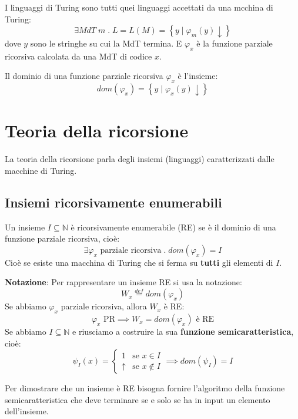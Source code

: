 \documentclass[a4paper]{article}
\begin{document}
\vspace{1em}
\noindent
I linguaggi di Turing sono tutti quei linguaggi accettati da una mcchina di Turing:
\[
  \exists  MdT \; m \;.\; L = L(M) = \left\{ \left. y \;\right|\; \varphi_m(y) \downarrow \right\}
\] 
dove \( y \) sono le stringhe su cui la MdT termina. E \( \varphi_x \) è la funzione
parziale ricorsiva calcolata da una MdT di codice \( x \).

\vspace{1em}
\noindent
\begin{definition}
  Il dominio di una funzione parziale ricorsiva \( \varphi_x \) è l'insieme:
  \[
    dom(\varphi_x) = \left\{ \left. y \;\right|\; \varphi_x(y) \downarrow \right\}
  \] 
\end{definition}


\section{Teoria della ricorsione}
La teoria della ricorsione parla degli insiemi (linguaggi) caratterizzati dalle macchine
di Turing.

\subsection{Insiemi ricorsivamente enumerabili}
\begin{definition}
  Un insieme \( I \subseteq \mathbb{N} \) è ricorsivamente enumerabile (RE) se è
  il dominio di una funzione parziale ricorsiva, cioè:
  \[
    \exists \varphi_x \text{ parziale ricorsiva} \;.\; dom(\varphi_x) = I
  \] 
  Cioè se esiste una macchina di Turing che si ferma su \textbf{tutti} gli elementi di \( I \).

  \vspace{1em}
  \noindent
  \textbf{Notazione}: Per rappresentare un insieme RE si usa la notazione:
  \[
    W_x \stackrel{def}{=} dom(\varphi_x)
  \] 
  Se abbiamo \( \varphi_x \) parziale ricorsiva, allora \( W_x \) è RE:
  \[
    \varphi_x \text{ PR} \implies W_x = dom(\varphi_x) \text{ è RE}
  \] 
  Se abbiamo \( I \subseteq \mathbb{N} \) e riusciamo a costruire la sua \textbf{funzione
  semicaratteristica}, cioè: 
  \[
    \psi_I(x) =
    \begin{cases}
      1 & \text{se } x \in I \\
      \uparrow & \text{se } x \notin I
    \end{cases}
    \implies dom(\psi_I) = I
  \] 
\end{definition}
Per dimostrare che un insieme è RE bisogna fornire l'algoritmo della funzione semicaratteristica
che deve terminare se e solo se ha in input un elemento dell'insieme.
\end{document}
